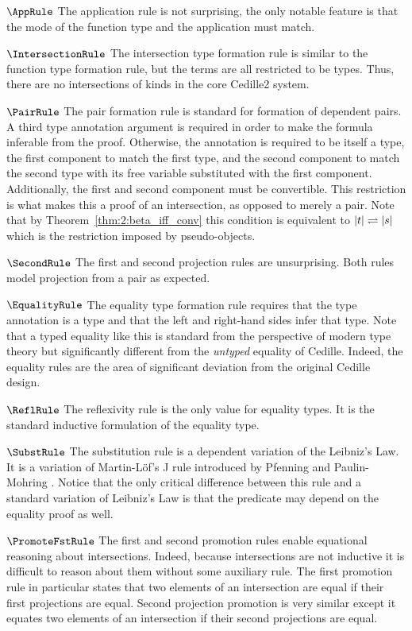 $\AppRule$ The application rule is not surprising, the only notable feature is that the mode of the function type and the application must match.

$\IntersectionRule$ The intersection type formation rule is similar to the function type formation rule, but the terms are all restricted to be types.
Thus, there are no intersections of kinds in the core Cedille2 system.

$\PairRule$ The pair formation rule is standard for formation of dependent pairs.
A third type annotation argument is required in order to make the formula inferable from the proof.
Otherwise, the annotation is required to be itself a type, the first component to match the first type, and the second component to match the second type with its free variable substituted with the first component.
Additionally, the first and second component must be convertible.
This restriction is what makes this a proof of an intersection, as opposed to merely a pair.
Note that by Theorem~\ref{thm:2:beta_iff_conv} this condition is equivalent to $|t| \rightleftharpoons |s|$ which is the restriction imposed by pseudo-objects.

$\SecondRule$ The first and second projection rules are unsurprising.
Both rules model projection from a pair as expected.

$\EqualityRule$ The equality type formation rule requires that the type annotation is a type and that the left and right-hand sides infer that type.
Note that a typed equality like this is standard from the perspective of modern type theory but significantly different from the \textit{untyped} equality of Cedille.
Indeed, the equality rules are the area of significant deviation from the original Cedille design.



$\ReflRule$ The reflexivity rule is the only value for equality types.
It is the standard inductive formulation of the equality type.

$\SubstRule$ The substitution rule is a dependent variation of the Leibniz's Law.
It is a variation of Martin-L\"{o}f's J rule introduced by Pfenning and Paulin-Mohring \cite{pfenning1990_subst}.
Notice that the only critical difference between this rule and a standard variation of Leibniz's Law is that the predicate may depend on the equality proof as well.

$\PromoteFstRule$ The first and second promotion rules enable equational reasoning about intersections.
Indeed, because intersections are not inductive it is difficult to reason about them without some auxiliary rule.
The first promotion rule in particular states that two elements of an intersection are equal if their first projections are equal.
Second projection promotion is very similar except it equates two elements of an intersection if their second projections are equal.

